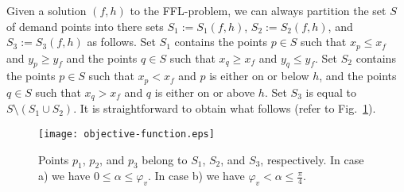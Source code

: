 \documentclass[11pt,a4paper,oneside,onecolumn]{article}
\begin{document}
Given a solution $(f,h)$ to the
FFL-problem, we can always partition the set $S$ of demand points
into there sets $S_1:=S_1(f,h)$, $S_2:=S_2(f,h)$, and
$S_3:=S_3(f,h)$ as follows. Set $S_1$ contains the points $p\in S$
such that $x_p\leq x_f$ and $y_p\geq y_f$ and the points $q\in S$
such that $x_q\geq x_f$ and $y_q\leq y_f$. Set $S_2$ contains the
points $p\in S$ such that $x_p<x_f$ and $p$ is either on or below
$h$, and the points $q\in S$ such that $x_q> x_f$ and $q$ is either
on or above $h$. Set $S_3$ is equal to $S\setminus (S_1\cup S_2)$.
It is straightforward to obtain what follows (refer to Fig.~\ref{fig:expression-detail}).
\begin{figure}[h]
  \centering
  \texttt{[image: objective-function.eps]}
  \caption{\small{Points $p_1$, $p_2$, and $p_3$ belong to $S_1$, $S_2$, and $S_3$,
  respectively. In case a) we have $0\leq\alpha\leq\varphi_v$.
  In case b) we have $\varphi_v<\alpha\leq\frac{\pi}{4}$.}}
  \label{fig:expression-detail}
\end{figure}
\end{document}
